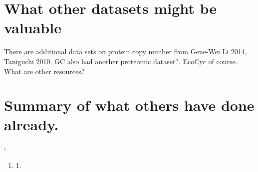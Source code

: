 \documentclass[preprint,10pt]{elsarticle}
\begin{document}
\section*{What other datasets might be valuable}

There are additional data sets on protein copy number from Gene-Wei Li 2014, Taniguchi 2010.
GC also had another proteomic dataset?. EcoCyc of course. What are other resources?

\section*{Summary of what others have done already.}
:
\begin{enumerate}
  \item 1.
\end{enumerate}
\end{document}
